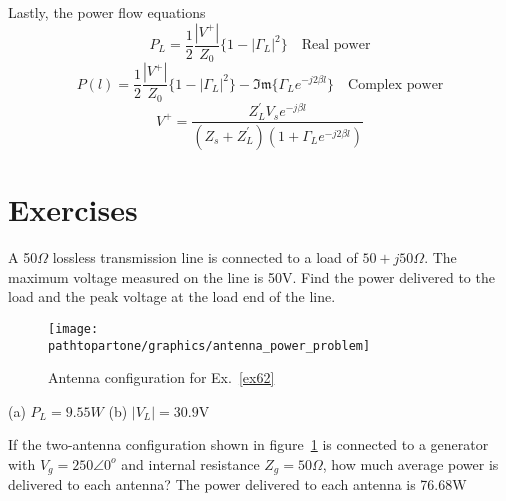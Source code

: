Lastly, the power flow equations
\begin{dmath*}
P_L = \frac{1}{2}\frac{|V^+|}{Z_0}\lbrace 1 - |\Gamma_L|^2\rbrace\quad\text{Real power}
\end{dmath*}
\begin{dmath*}
P(l) = \frac{1}{2}\frac{|V^+|}{Z_0}\lbrace 1 - |\Gamma_L|^2\rbrace - \mathfrak{Im}\lbrace \Gamma_L e^{- j2\beta l}\rbrace\quad\text{Complex power}
\end{dmath*}
\[
V^+ = \frac{Z_L^{'}V_s e^{-j\beta l}}{(Z_s + Z_L^{'})(1 + \Gamma_L e^{-j2\beta l})}
\]

\section*{Exercises}
\begin{ExerciseList}
\Exercise[label={ex61}]
A 50$\Omega$ lossless transmission line is connected to a load of $50 + j50\Omega$. The maximum voltage measured on the line is 50V. Find the power delivered to the load and the peak voltage at the load end of the line.
\begin{figure}[h]
\centering
\texttt{[image: \\pathtopartone/graphics/antenna\_power\_problem]}
\caption{Antenna configuration for Ex.~\ref{ex62}}
\label{fig:antennapowerproblem}
\end{figure}
\Answer[ref={ex61}]
(a) $P_L = 9.55W$ (b) $|V_L| = 30.9$V

\Exercise[label={ex62}]
If the two-antenna configuration shown in figure~\ref{fig:antennapowerproblem} is connected to a generator with $V_g = 250\angle0^o$ and internal resistance $Z_g = 50\varOmega$, how much average power is delivered to each antenna?
\Answer[ref={ex62}]
The power delivered to each antenna is 76.68W
\end{ExerciseList}